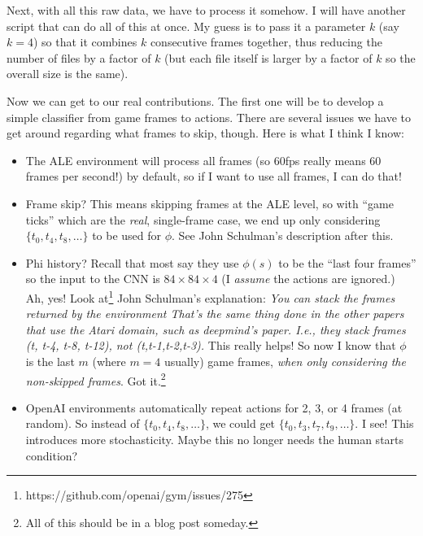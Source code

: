 \documentclass[letterpaper, 10pt, conference]{ieeeconf}
\begin{document}
Next, with all this raw data, we have to process it somehow. I will
    have another script that can do all of this at once. My guess is to pass it
    a parameter $k$ (say $k=4$) so that it combines $k$ consecutive frames
    together, thus reducing the number of files by a factor of $k$ (but each
    file itself is larger by a factor of $k$ so the overall size is the same).

Now we can get to our real contributions. The first one will be to
    develop a simple classifier from game frames to actions. There are several
    issues we have to get around regarding what frames to skip, though. Here is
    what I think I know:

    \begin{itemize}
        \item The ALE environment will process all frames (so 60fps really means
        60 frames per second!) by default, so if I want to use all frames, I can
        do that!

        \item Frame skip? This means skipping frames at the ALE level, so with
        ``game ticks'' which are the \emph{real}, single-frame case, we end up
        only considering $\{t_0, t_4, t_8, \ldots \}$ to be used for $\phi$. See
        John Schulman's description after this.

        \item Phi history? Recall that most say they use $\phi(s)$ to be the
        ``last four frames'' so the input to the CNN is $84 \times 84 \times 4$
        (I \emph{assume} the actions are ignored.) Ah, yes! Look
        at\footnote{https://github.com/openai/gym/issues/275} John
        Schulman's explanation: \emph{You can stack the frames returned by the
        environment That's the same thing done in the other papers that use the
        Atari domain, such as deepmind's paper.  I.e., they stack frames (t,
        t-4, t-8, t-12), not (t,t-1,t-2,t-3).} This really helps! So now I know
        that $\phi$ is the last $m$ (where $m=4$ usually) game frames,
        \emph{when only considering the non-skipped frames}. Got
        it.\footnote{All of this should be in a blog post someday.}

        \item OpenAI environments automatically repeat actions for 2, 3, or 4
        frames (at random). So instead of $\{t_0,t_4,t_8,\ldots\}$, we could get
        $\{t_0,t_3,t_7,t_9,\ldots\}$. I see! This introduces more stochasticity.
        Maybe this no longer needs the human starts condition?


\end{itemize}
\end{document}
